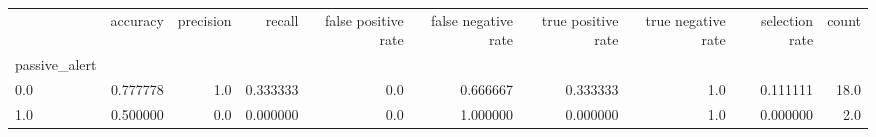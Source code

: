 \begin{tabular}{lrrrrrrrrr}
\toprule
{} &  accuracy &  precision &    recall &  false positive rate &  false negative rate &  true positive rate &  true negative rate &  selection rate &  count \\
passive\_alert &           &            &           &                      &                      &                     &                     &                 &        \\
\midrule
0.0           &  0.777778 &        1.0 &  0.333333 &                  0.0 &             0.666667 &            0.333333 &                 1.0 &        0.111111 &   18.0 \\
1.0           &  0.500000 &        0.0 &  0.000000 &                  0.0 &             1.000000 &            0.000000 &                 1.0 &        0.000000 &    2.0 \\
\bottomrule
\end{tabular}
